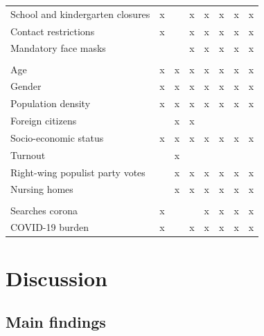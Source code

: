\documentclass[]{elsarticle} %
\begin{document}
\begin{table}
\begin{tabular}[t]{llllllll}
\hspace{1em}School and kindergarten closures & x &  & x & x & x & x & x\\
\hspace{1em}Contact restrictions & x &  & x & x & x & x & x\\
\hspace{1em}Mandatory face masks &  &  & x & x & x & x & x\\
\addlinespace[0.3em]
\multicolumn{8}{l}{\textbf{Socio-demographic}}\\
\hspace{1em}Age & x & x & x & x & x & x & x\\
\hspace{1em}Gender & x & x & x & x & x & x & x\\
\hspace{1em}Population density & x & x & x & x & x & x & x\\
\hspace{1em}Foreign citizens &  & x & x &  &  &  & \\
\hspace{1em}Socio-economic status & x & x & x & x & x & x & x\\
\hspace{1em}Turnout &  & x &  &  &  &  & \\
\hspace{1em}Right-wing populist party votes &  & x & x & x & x & x & x\\
\hspace{1em}Nursing homes &  & x & x & x & x & x & x\\
\addlinespace[0.3em]
\multicolumn{8}{l}{\textbf{Awareness}}\\
\hspace{1em}Searches corona & x &  &  & x & x & x & x\\
\hspace{1em}COVID-19 burden & x &  & x & x & x & x & x\\
\bottomrule
\end{tabular}
\end{table}

\hypertarget{discussion}{%
\section{Discussion}\label{discussion}}

\hypertarget{main-findings}{%
\subsection{Main findings}\label{main-findings}}
\end{document}
